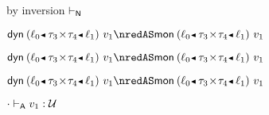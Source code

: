 {\begin{lamportproof*}
    \begin{pfproof}
        \begin{pfproof}
          by inversion $\vdash_{\mathsf{N}}$
        \end{pfproof}
        \begin{pfproof}
          \qedstep
            \begin{pfproof}
              $\edynb{\obnd{\sowner_0}{\tpair{\stype_3}{\stype_4}}{\sowner_1}}{\svalue_1} \nredAS \emon{\obnd{\sowner_0}{\tpair{\stype_3}{\stype_4}}{\sowner_1}}{\svalue_1}$
            \end{pfproof}
        \end{pfproof}
        \begin{pfproof}
          \qedstep
            \begin{pfproof}
              $\edynb{\obnd{\sowner_0}{\tpair{\stype_3}{\stype_4}}{\sowner_1}}{\svalue_1} \nredAS \emon{\obnd{\sowner_0}{\tpair{\stype_3}{\stype_4}}{\sowner_1}}{\svalue_1}$
            \end{pfproof}
        \end{pfproof}
        \begin{pfproof}
          \qedstep
            \begin{pfproof}
              $\edynb{\obnd{\sowner_0}{\tpair{\stype_3}{\stype_4}}{\sowner_1}}{\svalue_1} \nredAS \emon{\obnd{\sowner_0}{\tpair{\stype_3}{\stype_4}}{\sowner_1}}{\svalue_1}$
            \end{pfproof}
        \end{pfproof}
        \begin{pfproof}
          \absurdstep
            \begin{pfproof}
              ${\cdot} \vdash_{\mathsf{A}} v_1 : {\mathcal U}$
            \end{pfproof}
        \end{pfproof}

\end{pfproof}
\end{lamportproof*}}
